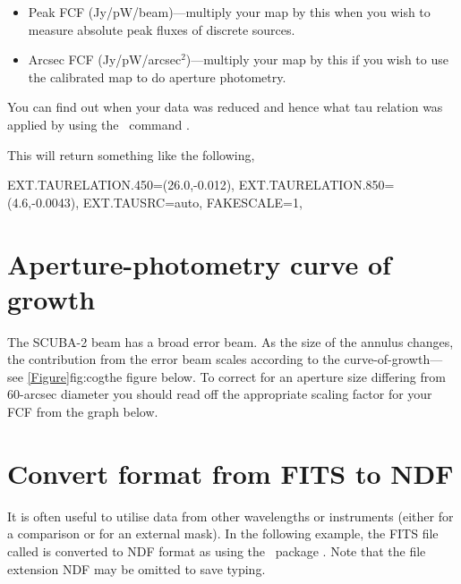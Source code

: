 \documentclass[11pt,oneside,chapters]{starlink}
\begin{document}
\vspace{-5mm}
\begin{itemize}
\item Peak FCF (Jy/pW/beam)---multiply your map by this when you wish
to measure absolute peak fluxes of discrete sources.
\item Arcsec FCF (Jy/pW/arcsec$^2$)---multiply your map by this if
you wish to use the calibrated map to do aperture photometry.
\end{itemize}
You can find out when your data was reduced and hence what tau
relation was applied by using the \Kappa\ command \hislist.
\vspace{-2mm}
\begin{terminalv}
\end{terminalv}
This will return something like the following,
\begin{terminalv}
      EXT.TAURELATION.450=(26.0,-0.012),
      EXT.TAURELATION.850=(4.6,-0.0043), EXT.TAUSRC=auto, FAKESCALE=1,
\end{terminalv}

\newpage
\chapter{Aperture-photometry curve of growth}
\label{app:cog}

The SCUBA-2 beam has a broad error beam. As the size of the annulus
changes, the contribution from the error beam scales according to the
curve-of-growth---see \cref{Figure}{fig:cog}{the figure below}. To correct for an
aperture size differing from 60-arcsec diameter you should read off the
appropriate scaling factor for your FCF from the graph below.


\newpage
\chapter{Convert format from FITS to NDF}
\label{app:fits}

It is often useful to utilise data from other wavelengths or
instruments (either for a comparison or for an external mask). In the
following example, the FITS file called  is
converted to NDF format as  using the \starlink\
package \convert. Note that the  file extension NDF may
be omitted to save typing.
\end{document}
